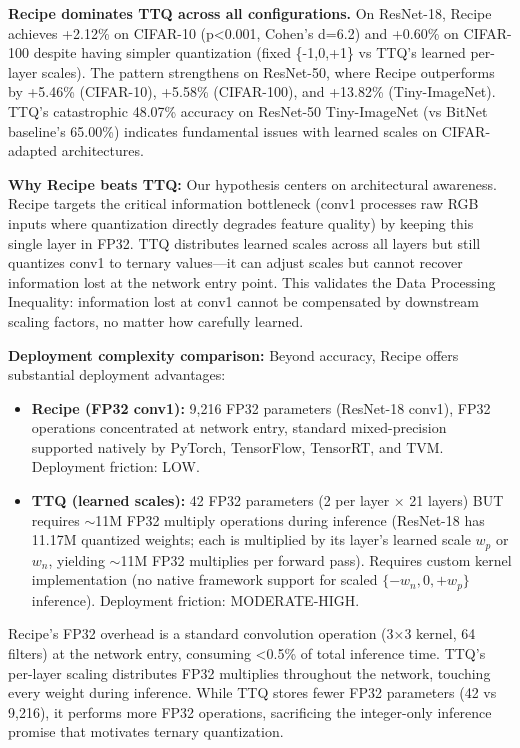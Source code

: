 \textbf{Recipe dominates TTQ across all configurations.} On ResNet-18, Recipe achieves +2.12\% on CIFAR-10 (p<0.001, Cohen's d=6.2) and +0.60\% on CIFAR-100 despite having simpler quantization (fixed \{-1,0,+1\} vs TTQ's learned per-layer scales). The pattern strengthens on ResNet-50, where Recipe outperforms by +5.46\% (CIFAR-10), +5.58\% (CIFAR-100), and +13.82\% (Tiny-ImageNet). TTQ's catastrophic 48.07\% accuracy on ResNet-50 Tiny-ImageNet (vs BitNet baseline's 65.00\%) indicates fundamental issues with learned scales on CIFAR-adapted architectures.

\textbf{Why Recipe beats TTQ:} Our hypothesis centers on architectural awareness. Recipe targets the critical information bottleneck (conv1 processes raw RGB inputs where quantization directly degrades feature quality) by keeping this single layer in FP32. TTQ distributes learned scales across all layers but still quantizes conv1 to ternary values—it can adjust scales but cannot recover information lost at the network entry point. This validates the Data Processing Inequality: information lost at conv1 cannot be compensated by downstream scaling factors, no matter how carefully learned.

\textbf{Deployment complexity comparison:} Beyond accuracy, Recipe offers substantial deployment advantages:

\begin{itemize}
    \item \textbf{Recipe (FP32 conv1):} 9,216 FP32 parameters (ResNet-18 conv1), FP32 operations concentrated at network entry, standard mixed-precision supported natively by PyTorch, TensorFlow, TensorRT, and TVM. Deployment friction: LOW.

    \item \textbf{TTQ (learned scales):} 42 FP32 parameters (2 per layer × 21 layers) BUT requires $\sim$11M FP32 multiply operations during inference (ResNet-18 has 11.17M quantized weights; each is multiplied by its layer's learned scale $w_p$ or $w_n$, yielding $\sim$11M FP32 multiplies per forward pass). Requires custom kernel implementation (no native framework support for scaled $\{-w_n, 0, +w_p\}$ inference). Deployment friction: MODERATE-HIGH.
\end{itemize}

Recipe's FP32 overhead is a standard convolution operation (3×3 kernel, 64 filters) at the network entry, consuming <0.5\% of total inference time. TTQ's per-layer scaling distributes FP32 multiplies throughout the network, touching every weight during inference. While TTQ stores fewer FP32 parameters (42 vs 9,216), it performs more FP32 operations, sacrificing the integer-only inference promise that motivates ternary quantization.

